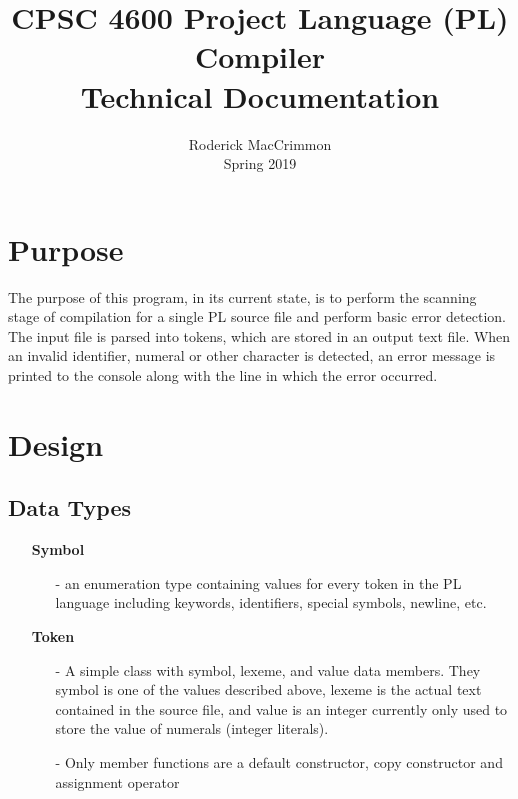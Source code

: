 \documentclass{article}
\begin{document}
\title{CPSC 4600 Project Language (PL) Compiler \\ \LARGE Technical Documentation}
\author{Roderick MacCrimmon \\ Spring 2019}
\date{}
\maketitle

\section{Purpose}

The purpose of this program, in its current state, is to perform the scanning stage of compilation 
for a single PL source file and perform basic error detection. The input file is parsed into tokens, which are stored in an output text file. When an invalid identifier, numeral or other character is detected, an error message is printed to the console along with the line in which the error occurred. 

\section{Design}

\subsection*{Data Types}

\begin{itemize}
    \item[] \textbf{Symbol}
        \begin{itemize}
            \item[-] an enumeration type containing values for every  token in the PL language including keywords, identifiers, special symbols, newline, etc.
        \end{itemize} 
    \item[] \textbf{Token} 
        \begin{itemize}
            \item[-] A simple class with symbol, lexeme, and value data members. They symbol is one of the values described above, lexeme is the actual text contained in the source file, and value is an integer currently only used to store the value of numerals (integer literals).
        \item[-] Only member functions are a default constructor, copy constructor and assignment operator 
        \end{itemize} 

\end{itemize}
\end{document}
